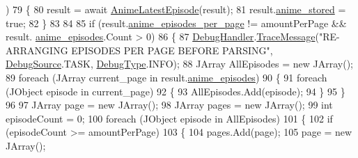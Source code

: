 \begin{DoxyCode}
      )
79                 \{
80                     result = await \mbox{\hyperlink{class_little_weeb_library_1_1_handlers_1_1_anime_profile_handler_a2f28ad03d4dfe8d90c0392da8af39651}{AnimeLatestEpisode}}(result);
81                     result.\mbox{\hyperlink{class_little_weeb_library_1_1_models_1_1_json_kitsu_anime_info_a11190c3959e72a4b3b9fdd482de156cb}{anime\_stored}} = \textcolor{keyword}{true};
82                 \}
83 
84 
85                 \textcolor{keywordflow}{if} (result.\mbox{\hyperlink{class_little_weeb_library_1_1_models_1_1_json_kitsu_anime_info_a11a2513ce95fe17d206eeb738811d087}{anime\_episodes\_per\_page}} != amountPerPage && result.
      \mbox{\hyperlink{class_little_weeb_library_1_1_models_1_1_json_kitsu_anime_info_ae788c0962dabe5e210fba53aecae820d}{anime\_episodes}}.Count > 0)
86                 \{
87                     \mbox{\hyperlink{class_little_weeb_library_1_1_handlers_1_1_anime_profile_handler_a0b0ae3c3838d26351485e6dfc566a632}{DebugHandler}}.\mbox{\hyperlink{interface_little_weeb_library_1_1_handlers_1_1_i_debug_handler_a2e405bc3492e683cd3702fae125221bc}{TraceMessage}}(\textcolor{stringliteral}{"RE-ARRANGING EPISODES PER PAGE
       BEFORE PARSING"}, \mbox{\hyperlink{namespace_little_weeb_library_1_1_handlers_a2a6ca0775121c9c503d58aa254d292be}{DebugSource}}.TASK, \mbox{\hyperlink{namespace_little_weeb_library_1_1_handlers_ab66019ed40462876ec4e61bb3ccb0a62}{DebugType}}.INFO);
88                     JArray AllEpisodes = \textcolor{keyword}{new} JArray();
89                     \textcolor{keywordflow}{foreach} (JArray current\_page \textcolor{keywordflow}{in} result.\mbox{\hyperlink{class_little_weeb_library_1_1_models_1_1_json_kitsu_anime_info_ae788c0962dabe5e210fba53aecae820d}{anime\_episodes}})
90                     \{
91                         \textcolor{keywordflow}{foreach} (JObject episode \textcolor{keywordflow}{in} current\_page)
92                         \{
93                             AllEpisodes.Add(episode);
94                         \}
95                     \}
96 
97                     JArray page = \textcolor{keyword}{new} JArray();
98                     JArray pages = \textcolor{keyword}{new} JArray();
99                     \textcolor{keywordtype}{int} episodeCount = 0;
100                     \textcolor{keywordflow}{foreach} (JObject episode \textcolor{keywordflow}{in} AllEpisodes)
101                     \{
102                         \textcolor{keywordflow}{if} (episodeCount >= amountPerPage)
103                         \{
104                             pages.Add(page);
105                             page = \textcolor{keyword}{new} JArray();

\end{DoxyCode}
